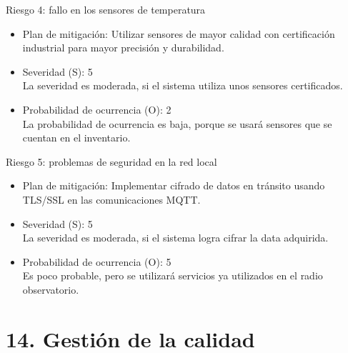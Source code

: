 \documentclass[
11pt, %
]{charter}
\begin{document}
Riesgo 4: fallo en los sensores de temperatura
  \begin{itemize}
  	\item Plan de mitigación: Utilizar sensores de mayor calidad con certificación industrial para mayor precisión y durabilidad.
	\item Severidad (S): 5 \\ 
	La severidad es moderada, si el sistema utiliza unos sensores certificados.
	\item Probabilidad de ocurrencia (O): 2 \\
	La probabilidad de ocurrencia es baja, porque se usará sensores que se cuentan en el inventario.
	\end{itemize}
\newpage
Riesgo 5: problemas de seguridad en la red local
\begin{itemize}
	\item Plan de mitigación: Implementar cifrado de datos en tránsito usando TLS/SSL en las comunicaciones MQTT.
	\item Severidad (S): 5 \\ 
	La severidad es moderada, si el sistema logra cifrar la data adquirida.
	\item Probabilidad de ocurrencia (O): 5 \\
	Es poco probable, pero se utilizará servicios ya utilizados en el radio observatorio.
\end{itemize}   

\section{14. Gestión de la calidad}
\label{sec:calidad}
\end{document}
